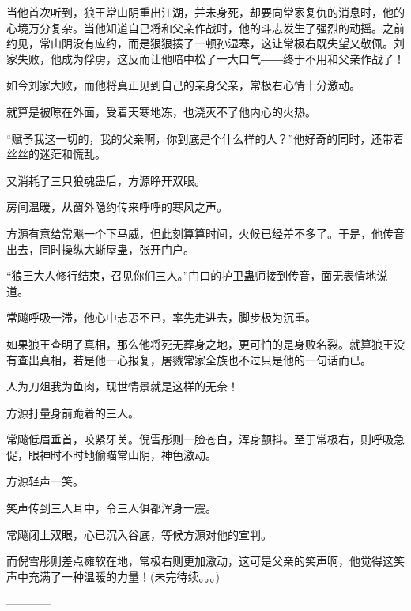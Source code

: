 \begin{this_body}
当他首次听到，狼王常山阴重出江湖，并未身死，却要向常家复仇的消息时，他的心境万分复杂。当他知道自己将和父亲作战时，他的斗志发生了强烈的动摇。之前约见，常山阴没有应约，而是狠狠揍了一顿孙湿寒，这让常极右既失望又敬佩。刘家失败，他成为俘虏，这反而让他暗中松了一大口气――终于不用和父亲作战了！

如今刘家大败，而他将真正见到自己的亲身父亲，常极右心情十分激动。

就算是被晾在外面，受着天寒地冻，也浇灭不了他内心的火热。

“赋予我这一切的，我的父亲啊，你到底是个什么样的人？”他好奇的同时，还带着丝丝的迷茫和慌乱。

又消耗了三只狼魂蛊后，方源睁开双眼。

房间温暖，从窗外隐约传来呼呼的寒风之声。

方源有意给常飚一个下马威，但此刻算算时间，火候已经差不多了。于是，他传音出去，同时操纵大蜥屋蛊，张开门户。

“狼王大人修行结束，召见你们三人。”门口的护卫蛊师接到传音，面无表情地说道。

常飚呼吸一滞，他心中忐忑不已，率先走进去，脚步极为沉重。

如果狼王查明了真相，那么他将死无葬身之地，更可怕的是身败名裂。就算狼王没有查出真相，若是他一心报复，屠戮常家全族也不过只是他的一句话而已。

人为刀俎我为鱼肉，现世情景就是这样的无奈！

方源打量身前跪着的三人。

常飚低眉垂首，咬紧牙关。倪雪彤则一脸苍白，浑身颤抖。至于常极右，则呼吸急促，眼神时不时地偷瞄常山阴，神色激动。

方源轻声一笑。

笑声传到三人耳中，令三人俱都浑身一震。

常飚闭上双眼，心已沉入谷底，等候方源对他的宣判。

而倪雪彤则差点瘫软在地，常极右则更加激动，这可是父亲的笑声啊，他觉得这笑声中充满了一种温暖的力量！(未完待续。。。)

------------

\end{this_body}

